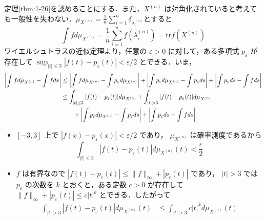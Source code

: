 \documentclass{ltjsarticle}
\makeatletter
\theoremstyle{mystyle1}
\theoremstyle{mystyle2}
\theoremstyle{mystyle3}
\renewenvironment{proof}[1][\proofname]{\par
  \pushQED{\qed}%
  \normalfont
  \topsep6\p@\@plus6\p@ \trivlist
  \item[\hskip\labelsep{\bfseries\sffamily #1}]\ignorespaces
}{%
  \popQED\endtrivlist\@endpefalse
}
\renewcommand\proofname{証明}
\makeatother
\begin{document}
\begin{proof}
    定理\ref{thm:1-26}を認めることにする．また，$X^{(n)}$ は対角化されていると考えても一般性を失わない．$\mu_{X^{(n)}}=\frac{1}{n}\sum_{i=1}^n\delta_{\lambda_i^{(n)}}$とすると
    \begin{equation}
        \int f d\mu_{X^{(n)}}=\frac{1}{n}\sum_{i=1}^nf(\lambda_i^{(n)})=\mathrm{tr}f(X^{(n)})
    \end{equation}
    ワイエルシュトラスの近似定理より，任意の $\varepsilon>0$ に対して，ある多項式 $ p_\varepsilon$ が存在して $\sup_{|t|\leq 3}|f(t)-p_\varepsilon(t)|<\varepsilon/2$ とできる．いま，
    \begin{equation}
        \begin{split}
            \mleft|\int f d\mu_{X^{(n)}}-\int f ds\mright|
            & \leq\mleft|\int f d\mu_{X^{(n)}}-\int p_\varepsilon d\mu_{X^{(n)}}\mright|+\mleft|\int p_\varepsilon d\mu_{X^{(n)}}-\int p_\varepsilon ds\mright|+\mleft|\int p_\varepsilon ds-\int f ds\mright| \\
            & \leq\int_{|t|\leq 3}|f(t)-p_\varepsilon(t)|d\mu_{X^{(n)}}+\int_{|t|> 3}|f(t)-p_\varepsilon(t)|d\mu_{X^{(n)}}                                                                                     \\
            & \qquad+\mleft|\int p_\varepsilon d\mu_{X^{(n)}}-\int p_\varepsilon ds\mright|+\mleft|\int p_\varepsilon ds-\int f ds\mright|
        \end{split}
    \end{equation}
    \begin{itemize}
        \item $[-3,3]$ 上で $|f(x)-p_\varepsilon(x)|<\varepsilon/2$ であり， $\mu_{X^{(n)}}$ は確率測度であるから
              \begin{equation}
                  \int_{|t|\leq 3} |f(t) - p_\varepsilon(t)| d\mu_{X^{(n)}}(t)<\frac{\varepsilon}{2}
              \end{equation}
        \item $f$ は有界なので $|f(t)-p_\varepsilon(t)|\leq\|f\|_\infty +|p_\varepsilon(t)|$ であり， $|t|>3$ では $p_\varepsilon$ の次数を $k$ とおくと，ある定数 $c>0$ が存在して $\|f\|_\infty+|p_\varepsilon(t)|\leq c|t|^k$ とできる．したがって
              \begin{equation}
                  \begin{split}
                      \int_{|t|>3}|f(t)-p_\varepsilon(t)|d\mu_{X^{(n)}}(t) & \leq\int_{|t|>3}c|t|^kd\mu_{X^{(n)}}(t)                                                                          \\

\end{split}
\end{equation}
\end{itemize}
\end{proof}
\end{document}
